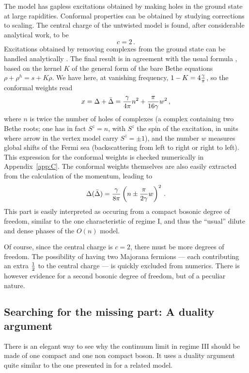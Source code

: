 \documentclass[11pt]{article}
\begin{document}
The model has gapless excitations obtained by making holes in the ground state at large rapidities.  Conformal properties can be obtained by studying corrections to scaling. The central charge of the untwisted model is found, after considerable analytical work, to be \cite{Nienhuis}
%
\begin{equation}
c=2 \,.
\end{equation}
%
Excitations obtained by removing complexes from the ground state can be handled analytically \cite{Nienhuis}. The final result is in agreement with the usual formula
\cite{KorepinBook}, based on the kernel $K$ of the general form of the bare Bethe equations $\rho+\rho^h=s+K\rho$. 
We  have here, at vanishing frequency, $1-K=4{\gamma\over\pi}$, so the conformal weights read
%
\begin{equation}
x=\Delta+\bar{\Delta}={\gamma\over 4\pi}n^2+{\pi\over 16\gamma}w^2 \,,
\label{fssIII}
\end{equation}
%
where  $n$ is twice the number of holes of complexes (a complex containing two Bethe roots; one has in fact $S^z=n$, with $S^z$ the spin of the excitation, in units where arrow in the vertex model carry $S^z=\pm 1$), and the number $w$ measures global shifts of the Fermi sea (backscattering from left to right or right to left).
This expression for the conformal weights is checked numerically in Appendix~\ref{app:C}.
The conformal weights themselves are also easily extracted from the calculation of the momentum, leading to
%
\begin{equation}
\Delta (\bar{\Delta})={\gamma\over 8\pi}\left(n\pm {\pi\over 2\gamma}w\right)^2 \,.
\end{equation}
%
This part is easily interpreted as occuring from a compact bosonic degree of freedom, similar to the one characteristic of regime I, and thus the ``usual'' dilute and dense phases of the $O(n)$ model.

Of course, since the central charge is $c=2$, there must be more degrees of freedom. The possibility of having two Majorana fermions --- each contributing an extra ${1\over 2}$ to the central charge --- is quickly excluded from numerics. There is however evidence for a second bosonic degree of freedom, but of a peculiar nature.

\subsection{Searching for the missing part: A duality argument}

There is an elegant way to see why the continuum limit in regime III should be made of one compact and one non compact boson. It uses a duality argument quite similar to the one presented in \cite{FendleyJacobsen} for a related model. 
 
\end{document}
